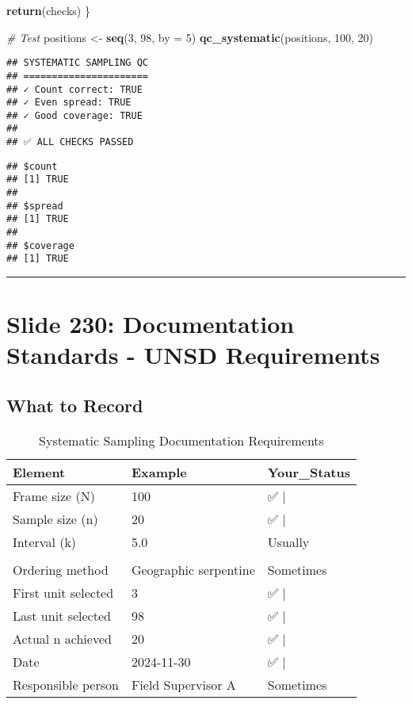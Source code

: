 \documentclass[
]{article}
\newenvironment{Shaded}{\begin{snugshade}}{\end{snugshade}}
\newcommand{\AttributeTok}[1]{\textcolor[rgb]{0.13,0.29,0.53}{#1}}
\newcommand{\CommentTok}[1]{\textcolor[rgb]{0.56,0.35,0.01}{\textit{#1}}}
\newcommand{\DecValTok}[1]{\textcolor[rgb]{0.00,0.00,0.81}{#1}}
\newcommand{\FunctionTok}[1]{\textcolor[rgb]{0.13,0.29,0.53}{\textbf{#1}}}
\newcommand{\NormalTok}[1]{#1}
\newcommand{\OtherTok}[1]{\textcolor[rgb]{0.56,0.35,0.01}{#1}}
\begin{document}
\begin{Shaded}
\begin{Highlighting}[]
  \FunctionTok{return}\NormalTok{(checks)}
\NormalTok{\}}

\CommentTok{\# Test}
\NormalTok{positions }\OtherTok{\textless{}{-}} \FunctionTok{seq}\NormalTok{(}\DecValTok{3}\NormalTok{, }\DecValTok{98}\NormalTok{, }\AttributeTok{by =} \DecValTok{5}\NormalTok{)}
\FunctionTok{qc\_systematic}\NormalTok{(positions, }\DecValTok{100}\NormalTok{, }\DecValTok{20}\NormalTok{)}
\end{Highlighting}
\end{Shaded}

\begin{verbatim}
## SYSTEMATIC SAMPLING QC
## ======================
## ✓ Count correct: TRUE 
## ✓ Even spread: TRUE 
## ✓ Good coverage: TRUE 
## 
## ✅ ALL CHECKS PASSED
\end{verbatim}

\begin{verbatim}
## $count
## [1] TRUE
## 
## $spread
## [1] TRUE
## 
## $coverage
## [1] TRUE
\end{verbatim}

\begin{center}\rule{0.5\linewidth}{0.5pt}\end{center}

\section{Slide 230: Documentation Standards - UNSD
Requirements}\label{slide-230-documentation-standards---unsd-requirements}

\subsection{What to Record}\label{what-to-record}

\begin{longtable}[t]{lll}
\caption{\label{tab:documentation-systematic}Systematic Sampling Documentation Requirements}\\
\toprule
Element & Example & Your\_Status\\
\midrule
Frame size (N) & 100 & ✅          |\\
Sample size (n) & 20 & ✅          |\\
Interval (k) & 5.0 & Usually\\
\cellcolor[HTML]{ffcccc}{Random start (r)} & \cellcolor[HTML]{ffcccc}{2.73} & \cellcolor[HTML]{ffcccc}{❌ Never    |}\\
Ordering method & Geographic serpentine & Sometimes\\
\addlinespace
First unit selected & 3 & ✅          |\\
Last unit selected & 98 & ✅          |\\
Actual n achieved & 20 & ✅          |\\
Date & 2024-11-30 & ✅          |\\
Responsible person & Field Supervisor A & Sometimes\\
\bottomrule
\end{longtable}
\end{document}
